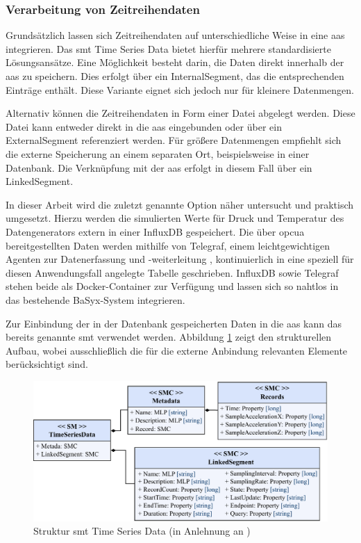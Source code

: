 \subsubsection{Verarbeitung von Zeitreihendaten}
\label{sec: VerarbeitungZeitreihen}
Grundsätzlich lassen sich Zeitreihendaten auf unterschiedliche Weise in eine \acs{aas} integrieren.
Das \acs{smt} Time Series Data \cite{SpezifikationTimeSeriesData} bietet hierfür mehrere standardisierte Lösungsansätze.
Eine Möglichkeit besteht darin, die Daten direkt innerhalb der \acs{aas} zu speichern. 
Dies erfolgt über ein InternalSegment, das die entsprechenden Einträge enthält.
Diese Variante eignet sich jedoch nur für kleinere Datenmengen.

Alternativ können die Zeitreihendaten in Form einer Datei abgelegt werden. 
Diese Datei kann entweder direkt in die \acs{aas} eingebunden oder über ein ExternalSegment referenziert werden.
Für größere Datenmengen empfiehlt sich die externe Speicherung an einem separaten Ort, beispielsweise in einer Datenbank.
Die Verknüpfung mit der \acs{aas} erfolgt in diesem Fall über ein LinkedSegment.

In dieser Arbeit wird die zuletzt genannte Option näher untersucht und praktisch umgesetzt.
Hierzu werden die simulierten Werte für Druck und Temperatur des Datengenerators extern in einer InfluxDB gespeichert.
Die über \acs{opcua} bereitgestellten Daten werden mithilfe von Telegraf, einem leichtgewichtigen Agenten zur Datenerfassung und -weiterleitung \cite{Influx}, kontinuierlich in eine speziell für diesen Anwendungsfall angelegte Tabelle geschrieben.
InfluxDB sowie Telegraf stehen beide als Docker-Container zur Verfügung und lassen sich so nahtlos in das bestehende BaSyx-System integrieren.

Zur Einbindung der in der Datenbank gespeicherten Daten in die \acs{aas} kann das bereits genannte \acs{smt} verwendet werden.
Abbildung \ref{fig:SMTTimeSeriesData} zeigt den strukturellen Aufbau, wobei ausschließlich die für die externe Anbindung relevanten Elemente berücksichtigt sind.

\begin{figure}[htbp]
    \centering
    \includegraphics[width=1\textwidth]{Bilder/TimeSeries/TimeSeriesData.pdf}
    \caption[Struktur \acs{smt} Time Series Data]{Struktur \acs{smt} Time Series Data (in Anlehnung an \cite{SpezifikationTimeSeriesData})}
    \label{fig:SMTTimeSeriesData}
\end{figure}

